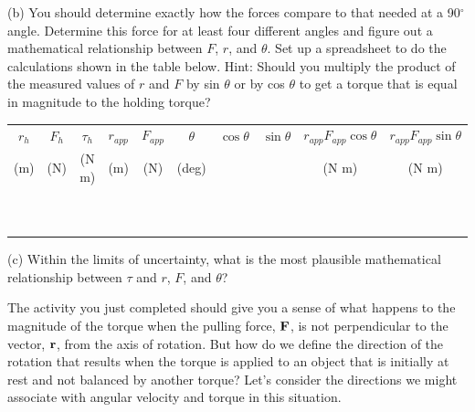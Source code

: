 (b) You should determine exactly how the forces compare to that needed at a
90\( ^{\circ } \) angle. Determine this force for at least four different angles
and figure out a mathematical relationship between $F$, $r$, and \( \theta  \).
Set up a spreadsheet to do the calculations shown in the table below. Hint:
Should you multiply the product of the measured values of $r$ and $F$ 
by sin \( \theta  \)
or by cos \( \theta  \) to get a torque that is equal in magnitude to the holding
torque?

\vspace{0.3cm}
{\centering \begin{tabular}{|c|c|c|c|c|c|c|c|c|c|}
\hline 
\( r_{h} \)&
\( F_{h} \)&
\( \tau _{h} \)&
\( r_{app} \)&
\( F_{app} \)&
\( \theta  \)&
\( \cos \theta  \)&
\( \sin \theta  \)&
\( r_{app} F_{app}\cos \theta  \) &
\(r_{app} F_{app}\sin \theta  \)\\
(m)&
(N)&
(N m)&
(m)&
(N)&
(deg)&
&
&
(N m)&
(N m)\\
\hline 
\hline 
&
&
&
&
&
&
&
&
&
\\
&
&
&
&
&
&
&
&
&
\\
\hline 
&
&
&
&
&
&
&
&
&
\\
&
&
&
&
&
&
&
&
&
\\
\hline 
&
&
&
&
&
&
&
&
&
\\
&
&
&
&
&
&
&
&
&
\\
\hline 
&
&
&
&
&
&
&
&
&
\\
&
&
&
&
&
&
&
&
&
\\
\hline 
&
&
&
&
&
&
&
&
&
\\
&
&
&
&
&
&
&
&
&
\\
\hline 
\end{tabular}\par}
\vspace{0.3cm}

(c) Within the limits of uncertainty, what is the most plausible mathematical
relationship between \( \tau  \) and $r$, $F$, and \( \theta  \)?
\vspace{20mm}

The activity you just completed should give you a sense of what happens to the
magnitude of the torque when the pulling force, \( {\bf F} \), is
not perpendicular to the vector, \( {\bf r} \), from the axis of
rotation. But how do we define the direction of the rotation that results when
the torque is applied to an object that is initially at rest and not balanced
by another torque? Let's consider the directions we might associate with angular
velocity and torque in this situation.

